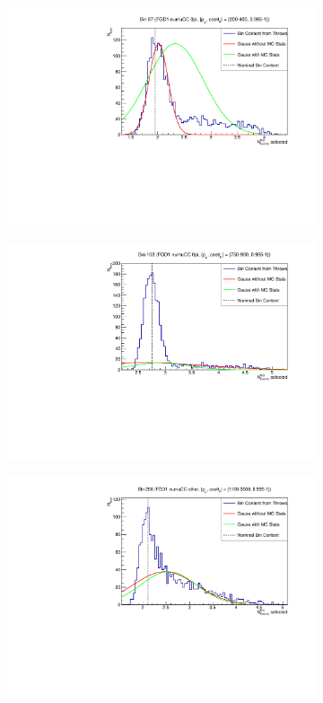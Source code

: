 \begin{figure}[h]
\centering
\begin{subfigure}{.49\textwidth}
  \centering
  \includegraphics[width=0.95\linewidth]{figs/detbin_allsysts97}
\end{subfigure}
\begin{subfigure}{.49\textwidth}
  \centering
  \includegraphics[width=0.95\linewidth]{figs/detbin_allsysts103}
\end{subfigure}
\begin{subfigure}{.49\textwidth}
  \centering
  \includegraphics[width=0.95\linewidth]{figs/detbin_allsysts258}

\end{subfigure}
\end{figure}
